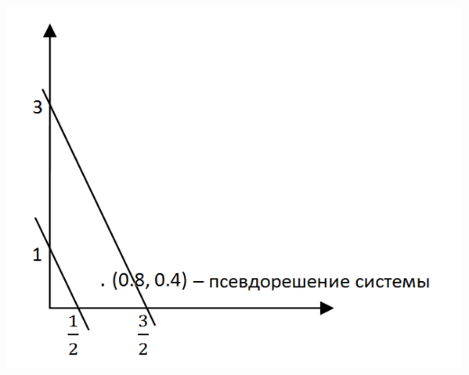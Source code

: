 \documentclass[12pt]{article}
\begin{document}
	\begin{center}
		\includegraphics[scale=0.6]{l2_1.png}
	\end{center}
\end{document}
